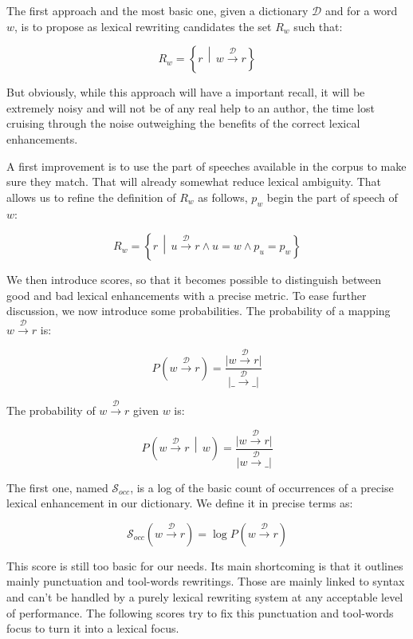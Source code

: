 \documentclass[a4paper, 11pt, onepage]{scrreprt}
\newcommand\maps[1]{\xrightarrow{\mathcal{#1}}}
\newcommand\card[1]{\lvert #1 \rvert}
\newcommand\suchthat{\, \middle| \,}
\newcommand\given{\, \middle| \,}
\newcommand\proba[2][]{P_{#1} \left( #2 \right)}
\begin{document}
The first approach and the most basic one, given a dictionary
$\mathcal{D}$ and for a word $w$, is to propose as lexical rewriting
candidates the set $R_w$ such that:

\[
R_w = \left\{r \suchthat w \maps{D} r\right\}
\]

But obviously, while this approach will have a important recall, it
will be extremely noisy and will not be of any real help to an author,
the time lost cruising through the noise outweighing the benefits of
the correct lexical enhancements.

A first improvement is to use the part of speeches available in the
corpus to make sure they match. That will already somewhat reduce
lexical ambiguity. That allows us to refine the definition of $R_w$ as
follows, $p_w$ begin the part of speech of $w$:

\begin{equation*}
  R_w = \left\{
    r \suchthat u \maps{D} r \land u = w \land p_u = p_w
  \right\}
\end{equation*}

We then introduce scores, so that it becomes possible to distinguish
between good and bad lexical enhancements with a precise metric. To
ease further discussion, we now introduce some probabilities. The
probability of a mapping $w \maps{D} r$ is:

\begin{equation*}
  \proba{w \maps{D} r} = \frac{\card{w \maps{D} r}}{\card{\_ \maps{D} \_}}
\end{equation*}

The probability of $w \maps{D} r$ given $w$ is:

\begin{equation*}
  \proba{w \maps{D} r \given w} = \frac{\card{w \maps{D} r}}{\card{w \maps{D} \_}}
\end{equation*}

The first one, named $\mathcal{S}_{occ}$, is a log of the basic count
of occurrences of a precise lexical enhancement in our dictionary. We
define it in precise terms as:

\begin{equation*}
  \mathcal{S}_{occ}(w \maps{D} r) = \log \proba{w \maps{D} r}
\end{equation*}

This score is still too basic for our needs. Its main shortcoming is
that it outlines mainly punctuation and tool-words rewritings. Those
are mainly linked to syntax and can't be handled by a purely lexical
rewriting system at any acceptable level of performance. The following
scores try to fix this punctuation and tool-words focus to turn it
into a lexical focus.
\end{document}
